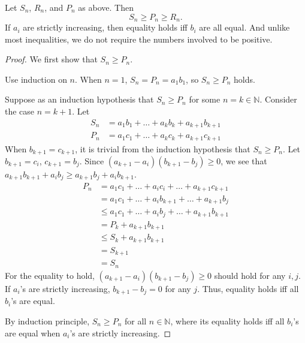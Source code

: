 \documentclass[../main.tex]{subfiles}
\begin{document}
\begin{thm} \label{thm:rearrange}
    Let $S_n$, $R_n$, and $P_n$ as above. 
    Then
    \[
        S_n \geq P_n \geq R_n.
    \]
    If $a_i$ are strictly increasing, then equality holds iff $b_i$ are all equal.
    And unlike most inequalities, we do not require the numbers involved to be positive.
\end{thm}
\begin{proof}
    We first show that $S_n \geq P_n$.

    Use induction on $n$. When $n = 1$, $S_n = P_n = a_1 b_1$, so $S_n \geq P_n$ holds.

    Suppose as an induction hypothesis that $S_n \geq P_n$ for some $n = k \in \mathbb N$.
    Consider the case $n = k + 1$.
    Let
    \begin{align*}
        S_n &= a_1 b_1 + \dots + a_k b_k + a_{k+1} b_{k+1}\\
        P_n &= a_1 c_1 + \dots + a_k c_k + a_{k+1} c_{k+1}
    \end{align*}
    When $b_{k+1} = c_{k+1}$, it is trivial from the induction hypothesis that $S_n \geq P_n$.
    Let $b_{k+1} = c_i$, $c_{k+1} = b_j$.
    Since $(a_{k+1} - a_i)(b_{k+1} - b_j) \geq 0$, we see that $a_{k+1} b_{k+1} + a_i b_j \geq a_{k+1} b_j + a_i b_{k+1}$.
    \begin{align*}
        P_n &= a_1 c_1 + \dots + a_i c_i + \dots + a_{k+1} c_{k+1}\\
            &= a_1 c_1 + \dots + a_i b_{k+1} + \dots + a_{k+1} b_j\\
            &\leq a_1 c_1 + \dots + a_i b_j + \dots + a_{k+1} b_{k+1}\\
            &= P_k + a_{k+1} b_{k+1}\\
            &\leq S_k + a_{k+1} b_{k+1}\\
            &= S_{k+1}\\
            &= S_n
    \end{align*}
    For the equality to hold, $(a_{k+1} - a_i)(b_{k+1} - b_j) \geq 0$ should hold for any $i, j$.
    If $a_i$'s are strictly increasing, $b_{k+1} - b_j = 0$ for any $j$.
    Thus, equality holds iff all $b_i$'s are equal.

    By induction principle, $S_n \geq P_n$ for all $n \in \mathbb N$, where its equality holds iff all $b_i$'s are equal when $a_i$'s are strictly increasing.


\end{proof}
\end{document}

